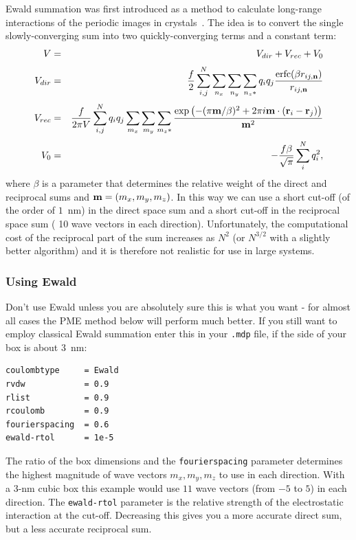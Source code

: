Ewald summation was first introduced as a method to calculate
long-range interactions of the periodic images in
crystals~\cite{Ewald21}. The idea is to convert the single
slowly-converging sum  into two
quickly-converging terms and a constant term:
\begin{eqnarray}
V &=& V_{dir} + V_{rec} + V_{0} \\[0.5ex]
V_{dir} &=& \frac{f}{2} \sum_{i,j}^{N} 
\sum_{n_x}\sum_{n_y}
\sum_{n_{z}*} q_i q_j \frac{\mbox{erfc}(\beta {r}_{ij,{\bf n}} )}{{r}_{ij,{\bf n}}} \\[0.5ex]
V_{rec} &=& \frac{f}{2 \pi V} \sum_{i,j}^{N} q_i q_j 
\sum_{m_x}\sum_{m_y}
\sum_{m_{z}*} \frac{\exp{\left( -(\pi {\bf m}/\beta)^2 + 2 \pi i
      {\bf m} \cdot ({\bf r}_i - {\bf r}_j)\right)}}{{\bf m}^2} \\[0.5ex]
V_{0} &=& -\frac{f \beta}{\sqrt{\pi}}\sum_{i}^{N} q_i^2,
\end{eqnarray}
where $\beta$ is a parameter that determines the relative weight of the
direct and reciprocal sums and ${\bf m}=(m_x,m_y,m_z)$.
In this way we can use a short cut-off (of the order of $1$~nm) in the direct space sum and a
short cut-off in the reciprocal space sum ({\eg} 10 wave vectors in each 
direction). Unfortunately, the computational cost of the reciprocal
part of the sum increases as $N^2$
(or $N^{3/2}$ with a slightly better algorithm) and it is therefore not 
realistic for use in large systems.

\subsubsection{Using Ewald}
Don't use Ewald unless you are absolutely sure this is what you want -
for almost all cases the PME method below will perform much better.
If you still want to employ classical Ewald summation enter this in
your {\tt .mdp} file, if the side of your box is about $3$~nm:

\begin{verbatim}
coulombtype     = Ewald
rvdw            = 0.9
rlist           = 0.9
rcoulomb        = 0.9
fourierspacing  = 0.6
ewald-rtol      = 1e-5
\end{verbatim}

The ratio of the box dimensions and the {\tt fourierspacing} parameter determines
the highest magnitude of wave vectors $m_x,m_y,m_z$ to use in each
direction. With a 3-nm cubic box this example would use $11$ wave vectors
(from $-5$ to $5$) in each direction.  The {\tt ewald-rtol} parameter
is the relative strength of the electrostatic interaction at the
cut-off. Decreasing this gives you a more accurate direct sum, but a
less accurate reciprocal sum.
 
